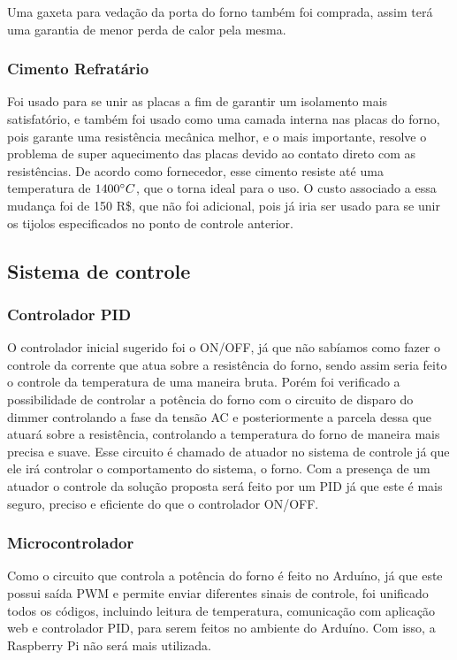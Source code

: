Uma gaxeta para vedação da porta do forno também foi comprada, assim terá uma garantia de menor perda de calor pela mesma.

\subsubsection{Cimento Refratário}
Foi usado para se unir as placas a fim de garantir um isolamento mais satisfatório, e também foi usado como uma camada interna nas placas do forno, pois garante uma resistência mecânica melhor, e o mais importante, resolve o problema de super aquecimento das placas devido ao contato direto com as resistências. De acordo como fornecedor, esse cimento resiste até uma temperatura de $1400\degree C$, que o torna ideal para o uso.
O custo associado a essa mudança foi de 150 R\$, que não foi adicional, pois já iria ser usado para se unir os tijolos especificados no ponto de controle anterior.

\subsection{Sistema de controle}
\subsubsection{Controlador PID}
O controlador inicial sugerido foi o ON/OFF, já que não sabíamos como fazer o controle da corrente que atua sobre a resistência do forno, sendo assim seria feito o controle da temperatura de uma maneira bruta. Porém foi verificado a possibilidade de controlar a potência do forno com o circuito de disparo do dimmer controlando a fase da tensão AC e posteriormente a parcela dessa que atuará sobre a resistência, controlando a temperatura do forno de maneira mais precisa e suave. Esse circuito é chamado de atuador no sistema de controle já que ele irá controlar o comportamento do sistema, o forno. Com a presença de um atuador o controle da solução proposta será feito por um PID já que este é mais seguro, preciso e eficiente do que o controlador ON/OFF.

\subsubsection{Microcontrolador}
Como o circuito que controla a potência do forno é feito no Arduíno, já que este possui saída PWM e permite enviar diferentes sinais de controle, foi unificado todos os códigos, incluindo leitura de temperatura, comunicação com aplicação web e controlador PID, para serem feitos no ambiente do Arduíno. Com isso, a Raspberry Pi não será mais utilizada.

